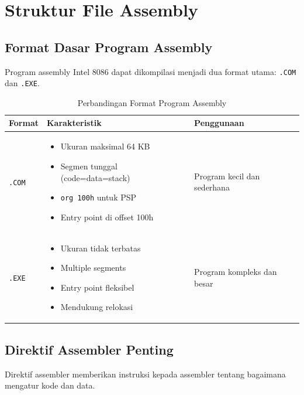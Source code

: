 \section{Struktur File Assembly}

\subsection{Format Dasar Program Assembly}
Program assembly Intel 8086 dapat dikompilasi menjadi dua format utama: \texttt{.COM} dan \texttt{.EXE}.

\begin{table}[h]
\centering
\caption{Perbandingan Format Program Assembly}
\begin{tabular}{|p{2cm}|p{6cm}|p{7cm}|}
\hline
\textbf{Format} & \textbf{Karakteristik} & \textbf{Penggunaan} \\
\hline
\texttt{.COM} & \begin{itemize}
\item Ukuran maksimal 64 KB
\item Segmen tunggal (code=data=stack)
\item \texttt{org 100h} untuk PSP
\item Entry point di offset 100h
\end{itemize} & Program kecil dan sederhana \\
\hline
\texttt{.EXE} & \begin{itemize}
\item Ukuran tidak terbatas
\item Multiple segments
\item Entry point fleksibel
\item Mendukung relokasi
\end{itemize} & Program kompleks dan besar \\
\hline
\end{tabular}
\label{tab:assembly-program-formats}
\end{table}

\subsection{Direktif Assembler Penting}
Direktif assembler memberikan instruksi kepada assembler tentang bagaimana mengatur kode dan data.


